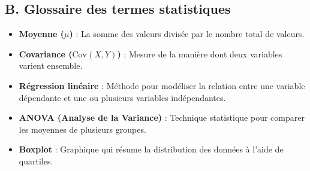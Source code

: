 \documentclass[
]{article}
\providecommand{\tightlist}{%
  \setlength{\itemsep}{0pt}\setlength{\parskip}{0pt}}
\begin{document}
\hypertarget{b.-glossaire-des-termes-statistiques}{%
\subsection{B. Glossaire des termes
statistiques}\label{b.-glossaire-des-termes-statistiques}}

\begin{itemize}
\tightlist
\item
  \textbf{Moyenne (\(\mu\))} : La somme des valeurs divisée par le
  nombre total de valeurs.
\item
  \textbf{Covariance (\(\text{Cov}(X, Y)\))} : Mesure de la manière dont
  deux variables varient ensemble.
\item
  \textbf{Régression linéaire} : Méthode pour modéliser la relation
  entre une variable dépendante et une ou plusieurs variables
  indépendantes.
\item
  \textbf{ANOVA (Analyse de la Variance)} : Technique statistique pour
  comparer les moyennes de plusieurs groupes.
\item
  \textbf{Boxplot} : Graphique qui résume la distribution des données à
  l'aide de quartiles.
\end{itemize}
\end{document}
